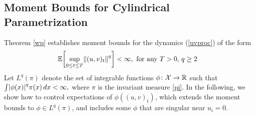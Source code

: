 \documentclass[11pt, twoside]{report}
\begin{document}
\subsection{Moment Bounds for Cylindrical Parametrization}
Theorem \ref{wp} establishes moment bounds for the dynamics (\ref{uvproc}) of the form
\begin{equation} \label{uv_moment}
    \mean{\sup_{0\le t\le T} \norm{(u,v)_t}^q}<\infty,\text{ for any }T>0, \, q\ge 2
\end{equation}
Let $L^q(\pi)$ denote the set of integrable functions $\phi\colon\mathcal X\to\mathbb{R}$ such that $\int \abs{\phi(x)}^q \pi(x)\,dx<\infty,$ where $\pi$ is the invariant measure \eqref{pi}. In the following,  we show how to control expectations of $\phi((u,v)_t)$, which extends the moment bounds to $\phi\in L^q(\pi)$, and includes some $\phi$ that are singular near $u_i=0$.
\end{document}
